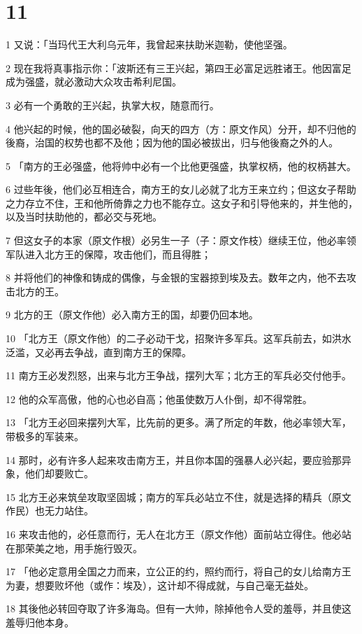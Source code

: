 \chapter{11}

\par 1 又说：「当玛代王大利乌元年，我曾起来扶助米迦勒，使他坚强。
\par 2 现在我将真事指示你：「波斯还有三王兴起，第四王必富足远胜诸王。他因富足成为强盛，就必激动大众攻击希利尼国。
\par 3 必有一个勇敢的王兴起，执掌大权，随意而行。
\par 4 他兴起的时候，他的国必破裂，向天的四方（方：原文作风）分开，却不归他的後裔，治国的权势也都不及他；因为他的国必被拔出，归与他後裔之外的人。
\par 5 「南方的王必强盛，他将帅中必有一个比他更强盛，执掌权柄，他的权柄甚大。
\par 6 过些年後，他们必互相连合，南方王的女儿必就了北方王来立约；但这女子帮助之力存立不住，王和他所倚靠之力也不能存立。这女子和引导他来的，并生他的，以及当时扶助他的，都必交与死地。
\par 7 但这女子的本家（原文作根）必另生一子（子：原文作枝）继续王位，他必率领军队进入北方王的保障，攻击他们，而且得胜；
\par 8 并将他们的神像和铸成的偶像，与金银的宝器掠到埃及去。数年之内，他不去攻击北方的王。
\par 9 北方的王（原文作他）必入南方王的国，却要仍回本地。
\par 10 「北方王（原文作他）的二子必动干戈，招聚许多军兵。这军兵前去，如洪水泛滥，又必再去争战，直到南方王的保障。
\par 11 南方王必发烈怒，出来与北方王争战，摆列大军；北方王的军兵必交付他手。
\par 12 他的众军高傲，他的心也必自高；他虽使数万人仆倒，却不得常胜。
\par 13 「北方王必回来摆列大军，比先前的更多。满了所定的年数，他必率领大军，带极多的军装来。
\par 14 那时，必有许多人起来攻击南方王，并且你本国的强暴人必兴起，要应验那异象，他们却要败亡。
\par 15 北方王必来筑垒攻取坚固城；南方的军兵必站立不住，就是选择的精兵（原文作民）也无力站住。
\par 16 来攻击他的，必任意而行，无人在北方王（原文作他）面前站立得住。他必站在那荣美之地，用手施行毁灭。
\par 17 「他必定意用全国之力而来，立公正的约，照约而行，将自己的女儿给南方王为妻，想要败坏他（或作：埃及），这计却不得成就，与自己毫无益处。
\par 18 其後他必转回夺取了许多海岛。但有一大帅，除掉他令人受的羞辱，并且使这羞辱归他本身。
